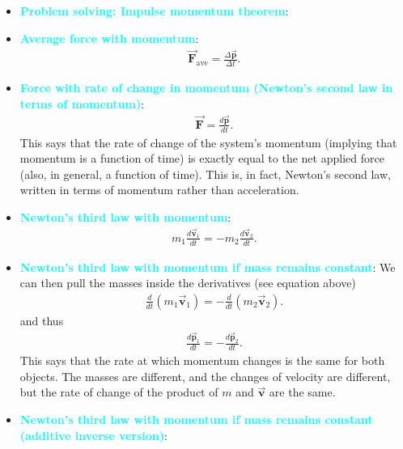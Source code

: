 \documentclass{report}
\begin{document}
\begin{itemize}
\begin{itemize}
            \end{itemize}
        \item \textbf{\textcolor{cyan}{Problem solving: Impulse momentum theorem}}:
        \item \textbf{\textcolor{cyan}{Average force with momentum}}:
            \begin{align*}
                \vec{\mathbf{F}}_{\text{ave}} = \frac{\Delta \vec{\mathbf{p}}}{\Delta t}
            .\end{align*}
        \item \textbf{\textcolor{cyan}{Force with rate of change in momentum (Newton's second law in terms of momentum)}}:
            \begin{align*}
                \vec{\mathbf{F}} = \frac{d\vec{\mathbf{p}}}{dt}
            .\end{align*}
            \bigbreak \noindent 
            This says that the rate of change of the system’s momentum (implying that momentum is a function of time) is exactly equal to the net applied force (also, in general, a function of time). This is, in fact, Newton’s second law, written in terms of momentum rather than acceleration.
        \item \textbf{\textcolor{cyan}{Newton's third law with momentum}}:
            \begin{align*}
                m_{1} \frac{d\vec{\mathbf{v}}_{1}}{dt} = -m_{2} \frac{d\vec{\mathbf{v}}_{2}}{dt}
            .\end{align*}
        \item \textbf{\textcolor{cyan}{Newton's third law with momentum if mass remains constant}}: We can then pull the masses inside the derivatives (see equation above)
            \begin{align*}
               \frac{d}{dt}(m_{1}\vec{\mathbf{v}}_{1}) = -\frac{d}{dt}(m_{2}\vec{\mathbf{v}}_{2}) 
            .\end{align*}
            and thus
            \begin{align*}
                \frac{d\vec{\mathbf{p}}_{1}}{dt} = - \frac{d\vec{\mathbf{p}}_{2}}{dt}
            .\end{align*}
            \bigbreak \noindent 
            This says that the rate at which momentum changes is the same for both objects. The masses are different, and the changes of velocity are different, but the rate of change of the product of $m$ and  $\vec{\mathbf{v}}$ are the same.
        \item \textbf{\textcolor{cyan}{Newton's third law with momentum if mass remains constant (additive inverse version)}}:

\end{itemize}
\end{document}
